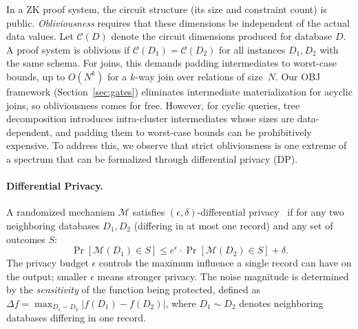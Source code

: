 \documentclass[sigconf]{acmart}
\renewcommand{\emph}[1]{\textit{#1}}
\begin{document}
In a ZK proof system, the circuit structure (its size and constraint count) is public. \emph{Obliviousness} requires that these dimensions be independent of the actual data values. Let $\mathcal{C}(D)$ denote the circuit dimensions produced for database $D$. A proof system is oblivious if $\mathcal{C}(D_1) = \mathcal{C}(D_2)$ for all instances $D_1, D_2$ with the same schema. For joins, this demands padding intermediates to worst-case bounds, up to $O(N^k)$ for a $k$-way join over relations of size~$N$. Our OBJ framework (Section~\ref{sec:gates}) eliminates intermediate materialization for acyclic joins, so obliviousness comes for free. However, for cyclic queries, tree decomposition introduces intra-cluster intermediates whose sizes are data-dependent, and padding them to worst-case bounds can be prohibitively expensive. To address this, we observe that strict obliviousness is one extreme of a spectrum that can be formalized through differential privacy (DP).

\vspace{-0.1in}
\paragraph{Differential Privacy.}
A randomized mechanism $\mathcal{M}$ satisfies $(\epsilon,\delta)$-differential privacy~\cite{dwork2006differential,dwork2014algorithmic} if for any two neighboring databases $D_1, D_2$ (differing in at most one record) and any set of outcomes $S$:
\[
\Pr[\mathcal{M}(D_1) \in S] \leq e^{\epsilon} \cdot \Pr[\mathcal{M}(D_2) \in S] + \delta.
\]
The privacy budget $\epsilon$ controls the maximum influence a single record can have on the output; smaller $\epsilon$ means stronger privacy. The noise magnitude is determined by the \emph{sensitivity} of the function being protected, defined as $\Delta f = \max_{D_1 \sim D_2} |f(D_1) - f(D_2)|$, where $D_1 \sim D_2$ denotes neighboring databases differing in one record.

\vspace{-0.1in}
\end{document}
